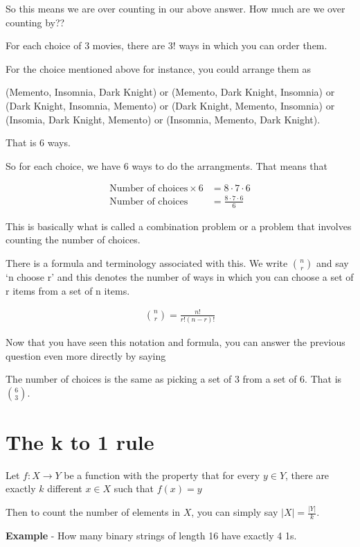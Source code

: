 \documentclass[12pt]{article}
\begin{document}
So this means we are over counting in our above answer. How much are we over counting by??

For each choice of 3 movies, there are 3! ways in which you can order them. 

For the choice mentioned above for instance, you could arrange them as

(Memento, Insomnia, Dark Knight) or (Memento, Dark Knight, Insomnia) or (Dark Knight, Insomnia, Memento) or (Dark Knight, Memento, Insomnia) or (Insomia, Dark Knight, Memento) or 
(Insomnia, Memento, Dark Knight). 

That is 6 ways.

So for each choice, we have 6 ways to do the arrangments. That means that

\begin{align*}
\text{Number of choices} \times 6 &= 8 \cdot 7 \cdot 6 \\
\text{Number of choices} &= \frac{8 \cdot 7 \cdot 6 }{6}
\end{align*}

This is basically what is called a combination problem or a problem that involves counting the number of choices.

There is a formula and terminology associated with this. We write ${n \choose r}$ and say `n choose r' and this denotes the number of ways in which you can choose a set of r items from a set of n items.

\begin{align*}
{n \choose r} = \frac{n!}{r!(n-r)!}
\end{align*}

Now that you have seen this notation and formula, you can answer the previous question even more directly by saying

The number of choices is the same as picking a set of 3 from a set of 6. That is $\binom{6}{3}$.

\section*{The k to 1 rule}
Let $f: X \rightarrow Y$ be a function with the property that for every $y \in Y$, there are exactly $k$ different $x \in X$ such that $f(x) = y$

Then to count the number of elements in $X$, you can simply say $|X| = \frac{|Y|}{k}$.

\medskip
\textbf{Example} - How many binary strings of length 16 have exactly 4 1s.
\end{document}
